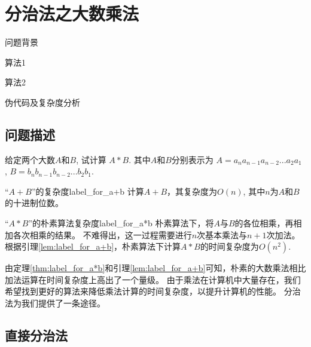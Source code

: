 \chapter{分治法之大数乘法}
\begin{introduction}
    \item 问题背景
    \item 算法1
    \item 算法2
    \item 伪代码及复杂度分析
\end{introduction}

\section{问题描述}
给定两个大数$A$和$B$, 试计算
\begin{math}
    A * B
\end{math}.
其中$A$和$B$分别表示为
\begin{math}
    A = a_n a_{n-1} a_{n-2} ... a_2 a_1
\end{math}
,
\begin{math}
    B = b_n b_{n-1} b_{n-2} ... b_2 b_1
\end{math}.

\begin{lemma}{“$A + B$”的复杂度}{label_for_a+b}
    计算$A + B$，其复杂度为$O(n)$, 其中$n$为$A$和$B$的十进制位数。
\end{lemma}
\begin{theorem}{“$A * B$”的朴素算法复杂度}{label_for_a*b}
    朴素算法下，将$A$与$B$的各位相乘，再相加各次相乘的结果。
    不难得出，这一过程需要进行$n$次基本乘法与$n+1$次加法。
    根据引理\ref{lem:label_for_a+b}，朴素算法下计算$A * B$的时间复杂度为$O(n^2)$.
\end{theorem}
由定理\ref{thm:label_for_a*b}和引理\ref{lem:label_for_a+b}可知，朴素的大数乘法相比加法运算在时间复杂度上高出了一个量级。
由于乘法在计算机中大量存在，我们希望找到更好的算法来降低乘法计算的时间复杂度，以提升计算机的性能。
分治法为我们提供了一条途径。
\section{直接分治法}
